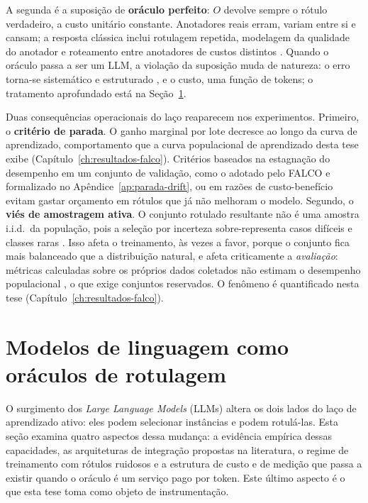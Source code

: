 A segunda é a suposição de \textbf{oráculo perfeito}: $O$ devolve sempre o
rótulo verdadeiro, a custo unitário constante. Anotadores reais erram, variam
entre si e cansam; a resposta clássica inclui rotulagem repetida, modelagem da
qualidade do anotador e roteamento entre anotadores de custos distintos
\cite{Sheng2008, Snow2008, Donmez2009, Yan2011}. Quando o oráculo passa a ser um LLM, a violação da suposição muda de natureza:
o erro torna-se sistemático e estruturado \cite{Song2023NoisyLabels}, e o
custo, uma função de tokens; o tratamento aprofundado está na
Seção~\ref{sec:fund-llm}.

Duas consequências operacionais do laço reaparecem nos experimentos. Primeiro, o \textbf{critério de parada}. O ganho marginal por
lote decresce ao longo da curva de aprendizado, comportamento que a curva
populacional de aprendizado desta tese exibe
(Capítulo~\ref{ch:resultados-falco}). Critérios baseados na estagnação do
desempenho em um conjunto de validação, como o adotado pelo FALCO e
formalizado no Apêndice~\ref{ap:parada-drift}, ou em razões de
custo-benefício \cite{Rouzegar2024Thesis} evitam gastar orçamento em
rótulos que já não melhoram o modelo.
Segundo, o \textbf{viés de amostragem ativa}. O conjunto rotulado resultante
não é uma amostra i.i.d.\ da população, pois a seleção por incerteza
sobre-representa casos difíceis e classes raras \cite{Santos2016Vies,
Settles2012}. Isso afeta o treinamento, às vezes a favor, porque o conjunto
fica mais balanceado que a distribuição natural, e afeta criticamente a
\emph{avaliação}: métricas calculadas sobre os próprios dados coletados não
estimam o desempenho populacional
\citep{Farquhar2021Bias, Kossen2021ActiveTesting}, o que exige conjuntos
reservados. O fenômeno é quantificado nesta tese
(Capítulo~\ref{ch:resultados-falco}).

\section{Modelos de linguagem como oráculos de rotulagem}
\label{sec:fund-llm}

O surgimento dos \textit{Large Language Models} (LLMs) altera os dois lados do
laço de aprendizado ativo: eles podem selecionar instâncias e podem
rotulá-las. Esta seção examina quatro aspectos dessa mudança: a evidência
empírica dessas capacidades, as arquiteturas de integração propostas na
literatura, o regime de treinamento com rótulos ruidosos e a estrutura de
custo e de medição que passa a existir quando o oráculo é um serviço pago por
token. Este último aspecto é o que esta tese
toma como objeto de instrumentação.

